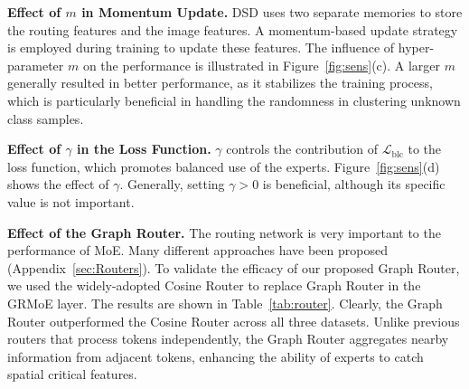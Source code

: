 \documentclass[10pt,twocolumn,letterpaper]{article}
\begin{document}
\textbf{Effect of $m$ in Momentum Update.}
DSD uses two separate memories to store the routing features and the image features. A momentum-based update strategy is employed during training to update these features. The influence of hyper-parameter $m$ on the performance is illustrated in Figure~\ref{fig:sens}(c). A larger $m$ generally resulted in better performance, as it stabilizes the training process, which is particularly beneficial in handling the randomness in clustering unknown class samples.

\textbf{Effect of $\gamma$ in the Loss Function.}
$\gamma$ controls the contribution of $\mathcal{L}_{\text{blc}}$ to the loss function, which promotes balanced use of the experts. Figure~\ref{fig:sens}(d) shows the effect of $\gamma$. Generally, setting $\gamma>0$ is beneficial, although its specific value is not important. 

\textbf{Effect of the Graph Router.}
The routing network is very important to the performance of MoE. Many different approaches have been proposed (Appendix~\ref{sec:Routers}). To validate the efficacy of our proposed Graph Router, we used the widely-adopted Cosine Router \cite{li2023sparse} to replace Graph Router in the GRMoE layer. The results are shown in Table~\ref{tab:router}. Clearly, the Graph Router outperformed the Cosine Router across all three datasets. Unlike previous routers that process tokens independently, the Graph Router aggregates nearby information from adjacent tokens, enhancing the ability of experts to catch spatial critical features.

\begin{table}[h]  \centering
  \caption{Comparison of Cosine Router and Graph Router's HOS~(\%) on the three datasets.}
  \addtolength{\tabcolsep}{3.0pt}
     \label{tab:router}
      \vspace{-0.1in}
\end{table}
\end{document}
